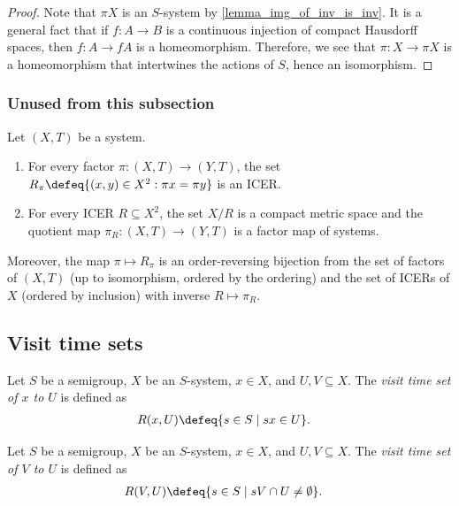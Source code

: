 \begin{proof}
    Note that $\pi X$ is an $S$-system by \cref{lemma_img_of_inv_is_inv}.  It is a general fact that if $f: A \to B$ is a continuous injection of compact Hausdorff spaces, then $f: A \to fA$ is a homeomorphism.  Therefore, we see that $\pi: X \to \pi X$ is a homeomorphism that intertwines the actions of $S$, hence an isomorphism.
\end{proof}

\subsubsection{Unused from this subsection}

\begin{lemma}
\label{lemma_factors_and_icers}
    Let $(X,T)$ be a system.
    \begin{enumerate}
        \item For every factor $\pi: (X,T) \to (Y,T)$, the set $R_\pi \defeq \{(x,y) \in X^2 : \pi x = \pi y\}$ is an ICER.
        \item For every ICER $R \subseteq X^2$, the set $X / R$ is a compact metric space and the quotient map $\pi_R: (X,T) \to (Y,T)$ is a factor map of systems.
    \end{enumerate}
    Moreover, the map $\pi \mapsto R_\pi$ is an order-reversing bijection from the set of factors of $(X,T)$ (up to isomorphism, ordered by the ordering) and the set of ICERs of $X$ (ordered by inclusion) with inverse $R \mapsto \pi_R$.
\end{lemma}


\subsection{Visit time sets}

\begin{definition}
\label{def_point_visit_time_set}
\leanok{}
    Let $S$ be a semigroup, $X$ be an $S$-system, $x \in X$, and $U, V \subseteq X$.  The \emph{visit time set of $x$ to $U$} is defined as
    \begin{align*}
        R(x,U) &\defeq \{s \in S \mid sx \in U \}.
    \end{align*}
\end{definition}

\begin{definition}
\label{def_set_visit_time_set}
\leanok{}
    Let $S$ be a semigroup, $X$ be an $S$-system, $x \in X$, and $U, V \subseteq X$.  The \emph{visit time set of $V$ to $U$} is defined as
    \begin{align*}
        R(V,U) &\defeq \{s \in S \mid sV \cap U \neq \emptyset\}.
    \end{align*}
\end{definition}

